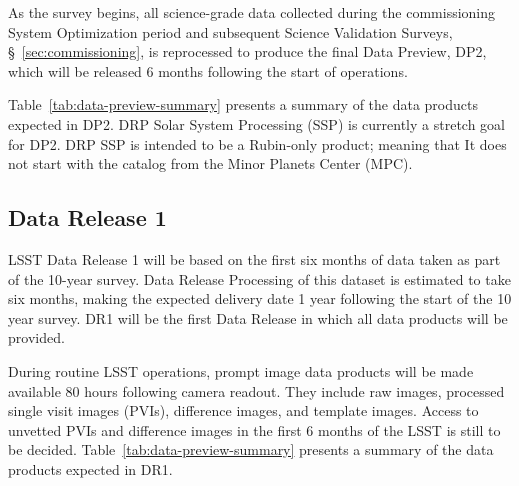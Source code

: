 As the survey begins, all science-grade data collected during the commissioning System Optimization period and subsequent Science Validation Surveys, \S~\ref{sec:commissioning}, is reprocessed to produce the final Data Preview, DP2, which will be released 6 months following the start of operations.

Table~\ref{tab:data-preview-summary} presents a summary of the data products expected in DP2.
DRP Solar System Processing (SSP)  is currently a stretch goal for DP2. 
DRP SSP is intended to be a Rubin-only product; meaning that  It does not start with the catalog from the Minor Planets Center (MPC).


\subsection{Data Release 1}
\label{sec:dr1}

LSST Data Release 1 will be based on the first six months of data taken as part of the 10-year survey. 
Data Release Processing of this dataset is estimated to take six months, making the expected delivery date 1 year following the start of the 10 year survey. 
DR1 will be the first Data Release in which all data products will be provided.

During routine LSST operations, prompt image data products will be made available 80 hours following camera readout. 
They include raw images, processed single visit images (PVIs), difference images, and template images. 
Access to unvetted PVIs and difference images in the first 6 months of the LSST is still to be decided. 
Table~\ref{tab:data-preview-summary} presents a summary of the data products expected in DR1.



